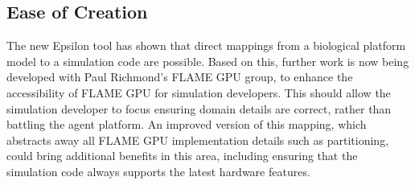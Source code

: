 \documentclass{UoYCSproject}
\begin{document}
\subsection{Ease of Creation}
The new Epsilon tool has shown that direct mappings from a biological platform model to a simulation code are possible.
Based on this, further work is now being developed with Paul Richmond's \gls{FLAME GPU} group, to enhance the accessibility of \gls{FLAME GPU} for simulation developers.
This should allow the simulation developer to focus ensuring domain details are correct, rather than battling the agent platform.
An improved version of this mapping, which abstracts away all \gls{FLAME GPU} implementation details such as partitioning, could bring additional benefits in this area, including ensuring that the simulation code always supports the latest hardware features.
\end{document}
